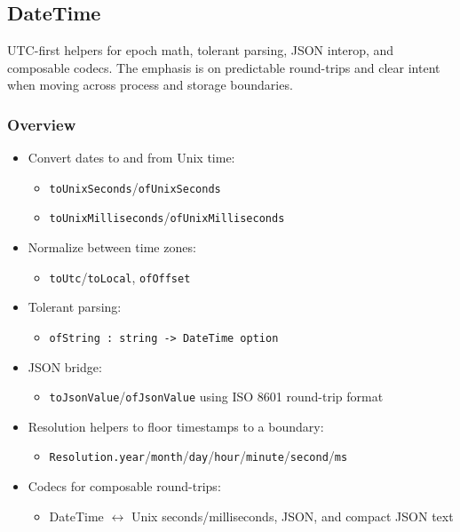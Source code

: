 \documentclass{article}
\begin{document}
\subsection{DateTime}

\noindent UTC-first helpers for epoch math, tolerant parsing, JSON interop, and composable codecs. The emphasis is on predictable round-trips and clear intent when moving across process and storage boundaries.

\subsubsection{Overview}
\begin{itemize}
  \item Convert dates to and from Unix time:
    \begin{itemize}
      \item \texttt{toUnixSeconds}/\texttt{ofUnixSeconds}
      \item \texttt{toUnixMilliseconds}/\texttt{ofUnixMilliseconds}
    \end{itemize}
  \item Normalize between time zones:
    \begin{itemize}
      \item \texttt{toUtc}/\texttt{toLocal}, \texttt{ofOffset}
    \end{itemize}
  \item Tolerant parsing:
    \begin{itemize}
      \item \texttt{ofString : string -> DateTime option}
    \end{itemize}
  \item JSON bridge:
    \begin{itemize}
      \item \texttt{toJsonValue}/\texttt{ofJsonValue} using ISO 8601 round-trip format
    \end{itemize}
  \item Resolution helpers to floor timestamps to a boundary:
    \begin{itemize}
      \item \texttt{Resolution.year}/\texttt{month}/\texttt{day}/\texttt{hour}/\texttt{minute}/\texttt{second}/\texttt{ms}
    \end{itemize}
  \item Codecs for composable round-trips:
    \begin{itemize}
      \item DateTime \(\leftrightarrow\) Unix seconds/milliseconds, JSON, and compact JSON text
    \end{itemize}
\end{itemize}
\end{document}
